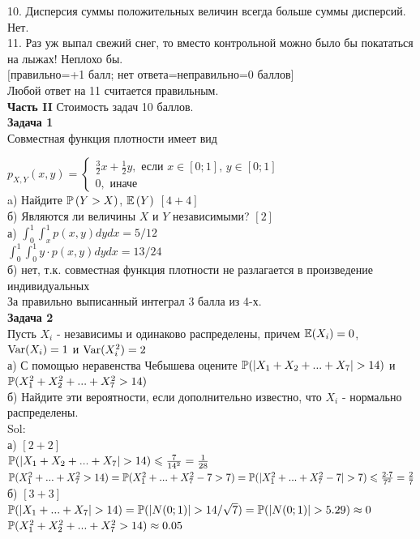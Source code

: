 \documentclass[12pt, a4paper]{article}\usepackage[]{graphicx}\usepackage[]{color}
\begin{document}
10. Дисперсия суммы положительных величин всегда больше суммы дисперсий. Нет. \\

11. Раз уж выпал свежий снег, то вместо контрольной можно
было бы покататься на лыжах! Неплохо бы. \\


$[$правильно=+1 балл; нет ответа=неправильно=0 баллов$]$ \\
Любой ответ на 11 считается правильным. \\


\textbf{Часть II} Стоимость задач 10 баллов. \\

\textbf{Задача 1} \\ %
Совместная функция плотности имеет вид

$p_{X,Y} \left(x,y\right)=
\left\{
\begin{array}{l}
{\frac{3}{2}x+\frac{1}{2}y, \text{ если } x\in \left[0;1\right],\, y\in \left[0;1\right]} \\
{0,\text{ иначе} }
\end{array}\right. $\\
a) Найдите  $\P\left(Y>X\right)$,  $\E\left(Y\right)$ $[4+4]$ \\
б) Являются ли величины $X$ и $Y$ независимыми? $[2]$ \\

а) $\int_{0}^{1}\int_{x}^{1}p(x,y)dydx=5/12$ \\
$\int_{0}^{1}\int_{0}^{1}y\cdot p(x,y)dydx=13/24$ \\
б) нет, т.к. совместная функция плотности не разлагается в произведение индивидуальных \\
За правильно выписанный интеграл 3 балла из 4-х. \\



\textbf{Задача 2} \\ %
Пусть $X_{i}$ - независимы и одинаково распределены, причем $\E(X_{i})=0$, $\Var(X_{i})=1$ и $\Var(X_{i}^{2})=2$ \\
а) С помощью неравенства Чебышева оцените $\P(|X_{1}+X_{2}+...+X_{7}|>14)$ и $\P(X_{1}^{2}+X_{2}^{2}+...+X_{7}^{2}>14)$ \\
б) Найдите эти вероятности, если дополнительно известно, что $X_{i}$ - нормально распределены. \\
Sol: \\
а) $[2+2]$ \\
$\P(|X_{1}+X_{2}+...+X_{7}|>14)\leq \frac{7}{14^2}=\frac{1}{28}$ \\
$\P(X_{1}^{2}+...+X_{7}^{2}>14)=\P(X_{1}^{2}+...+X_{7}^{2}-7>7)=\P(|X_{1}^{2}+...+X_{7}^{2}-7|>7)\leq \frac{2\cdot 7}{7^2}=\frac{2}{7}$ \\
б) $[3+3]$ \\
$\P(|X_{1}+...+X_{7}|>14)=\P(|N(0;1)|>14/\sqrt{7})=\P(|N(0;1)|>5.29)\approx 0$ \\
$\P(X_{1}^{2}+X_{2}^{2}+...+X_{7}^{2}>14)\approx 0.05$ \\
\end{document}
